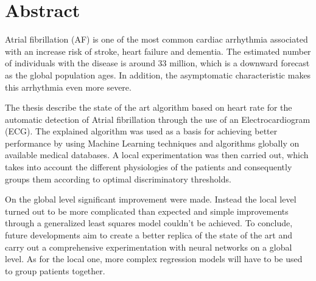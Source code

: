 \section*{\hfil Abstract\hfil}

\begin{center}
Atrial fibrillation (AF) is one of the most common cardiac arrhythmia associated with an increase risk of stroke, heart failure and dementia. The estimated number of individuals with the disease is around 33 million, which is a downward forecast as the global population ages. In addition, the asymptomatic characteristic makes this arrhythmia even more severe.
\newline

The thesis describe the state of the art algorithm based on heart rate for the automatic detection of Atrial fibrillation through the use of an Electrocardiogram (ECG).
The explained algorithm was used as a basis for achieving better performance by using Machine Learning techniques and algorithms globally on available medical databases. A local experimentation was then carried out, which takes into account the different physiologies of the patients and consequently groups them according to optimal discriminatory thresholds.
\newline

On the global level significant improvement were made. Instead the local level turned out to be more complicated than expected and simple improvements through a generalized least squares model couldn't be achieved. To conclude, future developments aim to create a better replica of the state of the art and carry out a comprehensive experimentation with neural networks on a global level. As for the local one, more complex regression models will have to be used to group patients together.
\end{center}
\newpage